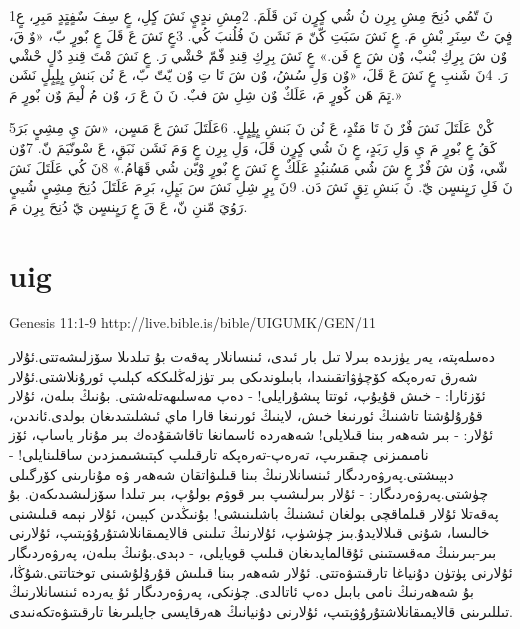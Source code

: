 \documentclass[12pt,fleqn,titlepage,twoside,a4paper]{book}
\begin{document}
\begin{arab}[utf]
\section*{}

1نَ تّمُي دُنِحَ مِشِ بِرِن نُ شُي كٍرٍن نَن قَلَمَ. 2مِشِ ندٍيٍ نَشَ كٍلِ، عٍ سِفَ سٌفٍتٍدٍ مَبِرِ، عٍ فٍيَ تٌ سِنَرِ بْشِ مَ. عٍ نَشَ سَبَتِ كّنّ مَ نَشَن نَ فُلُنبَ كُي. 3عٍ نَشَ عَ قَلَ عٍ بٌورٍ بّ، «وٌ قَ، وٌن شَ بِرِكِ بْنبْ، وٌن شَ عٍ فَن.» عٍ نَشَ بِرِكِ قِندِ فّمّ حْشْي رَ. عٍ نَشَ مْتَ قِندِ دٌلٍ حْشْي رَ. 4نَ شَنبِ عٍ نَشَ عَ قَلَ، «وٌن وَلِ سُشُ، وٌن شَ تَا تِ وٌن يّتّ بّ، عَ نُن بَنشِ بٍلٍبٍلٍ نَشَن تٍمَ هَن كٌورٍ مَ، عَلَكٌ وٌن شِلِ شَ فبٌ. نَ نَ عَ رَ، وٌن مُ لْيمَ وٌن بٌورٍ مَ.»

5كْنْ عَلَتَلَ نَشَ فٌرٌ نَ تَا مَتٌدٍ، عَ نُن نَ بَنشِ بٍلٍبٍلٍ. 6عَلَتَلَ نَشَ عَ مَسٍن، «شَ يِ مِشِيٍ بَرَ كَقُ عٍ بٌورٍ مَ يِ وَلِ رَبَدٍ، عٍ نَ شُي كٍرٍن قَلَ، وَلِ بِرِن عٍ وَ مَ نَشَن نَبَقٍ، عَ سْونّيَمَ نّ. 7وٌن شّي، وٌن شَ فٌرٌ عٍ شَ شُي مَسُنبُدٍ عَلَكٌ عٍ نَشَ عٍ بٌورٍ وْيّن شُي قَهَامُ.» 8نَ كُي عَلَتَلَ نَشَ نَ فَلِ رَيٍنسٍن يّ. نَ بَنشِ تِقٍ نَشَ دَن. 9نَ يِرٍ شِلِ نَشَ سَ بَبٍلِ، بَرِ مَ عَلَتَلَ دُنِحَ مِشِيٍ شُييٍ رَوُيَ مّننِ نّ، عَ قَ عٍ رَيٍنسٍن يّ دُنِحَ بِرِن مَ.


\end{arab}


\section{uig}

Genesis 11:1-9 http://live.bible.is/bible/UIGUMK/GEN/11

\begin{arab}[utf]

دەسلەپتە، يەر يۈزىدە بىرلا تىل بار ئىدى، ئىنسانلار پەقەت بۇ تىلدىلا سۆزلىشەتتى.ئۇلار شەرق تەرەپكە كۆچۈۋاتقىنىدا، بابىلوندىكى بىر تۈزلەڭلىككە كېلىپ ئورۇنلاشتى.ئۇلار ئۆزئارا: - خىش قۇيۇپ، ئوتتا پىشۇرايلى! - دەپ مەسلىھەتلەشتى. بۇنىڭ بىلەن، ئۇلار قۇرۇلۇشتا تاشنىڭ ئورنىغا خىش، لاينىڭ ئورنىغا قارا ماي ئىشلىتىدىغان بولدى.ئاندىن، ئۇلار: - بىر شەھەر بىنا قىلايلى! شەھەردە ئاسمانغا تاقاشقۇدەك بىر مۇنار ياساپ، ئۆز نامىمىزنى چىقىرىپ، تەرەپ-تەرەپكە تارقىلىپ كېتىشىمىزدىن ساقلىنايلى! - دېيىشتى.پەرۋەردىگار ئىنسانلارنىڭ بىنا قىلىۋاتقان شەھەر ۋە مۇنارىنى كۆرگىلى چۈشتى.پەرۋەردىگار: - ئۇلار بىرلىشىپ بىر قوۋم بولۇپ، بىر تىلدا سۆزلىشىدىكەن. بۇ پەقەتلا ئۇلار قىلماقچى بولغان ئىشنىڭ باشلىنىشى! بۇنىڭدىن كېيىن، ئۇلار نېمە قىلىشنى خالىسا، شۇنى قىلالايدۇ.بىز چۈشۈپ، ئۇلارنىڭ تىلىنى قالايمىقانلاشتۇرۇۋېتىپ، ئۇلارنى بىر-بىرىنىڭ مەقسىتىنى ئۇقالمايدىغان قىلىپ قويايلى، - دېدى.بۇنىڭ بىلەن، پەرۋەردىگار ئۇلارنى پۈتۈن دۇنياغا تارقىتىۋەتتى. ئۇلار شەھەر بىنا قىلىش قۇرۇلۇشىنى توختاتتى.شۇڭا، بۇ شەھەرنىڭ نامى بابىل دەپ ئاتالدى. چۈنكى، پەرۋەردىگار ئۇ يەردە ئىنسانلارنىڭ تىللىرىنى قالايمىقانلاشتۇرۇۋېتىپ، ئۇلارنى دۇنيانىڭ ھەرقايسى جايلىرىغا تارقىتىۋەتكەنىدى.

\end{arab}
\end{document}
